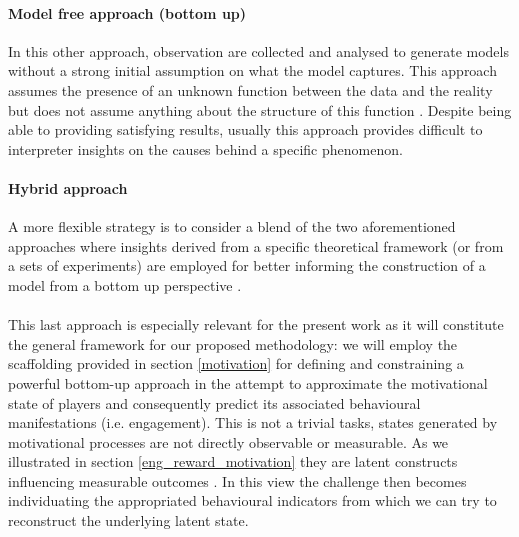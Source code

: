 \paragraph*{Model free approach (bottom up)} In this other approach, observation are collected and analysed to generate models without a strong initial assumption on what the model captures. This approach assumes the presence of an unknown function between the data and the reality but does not assume anything about the structure of this function \cite{yannakakis2013player}. Despite being able to providing satisfying results, usually this approach provides difficult to interpreter insights on the causes behind a specific phenomenon.

\paragraph*{Hybrid approach} A more flexible strategy is to consider a blend of the two aforementioned approaches where insights derived from a specific theoretical framework (or from a sets of experiments) are employed for better informing the construction of a model from a bottom up perspective \cite{yannakakis2013player}. 
\\
\\
This last approach is especially relevant for the present work as it will constitute the general framework for our proposed methodology: we will employ the scaffolding provided in section \ref{motivation} for defining and constraining a powerful bottom-up approach in the attempt to approximate the motivational state of players and consequently predict its associated behavioural manifestations (i.e. engagement). This is not a trivial tasks, states generated by motivational processes are not directly observable or measurable. As we illustrated in section \ref{eng_reward_motivation} they are latent constructs influencing measurable outcomes \cite{yannakakis2007game, bauckhage2012players}. In this view the challenge then becomes individuating the appropriated behavioural indicators from which we can try to reconstruct the underlying latent state. 

